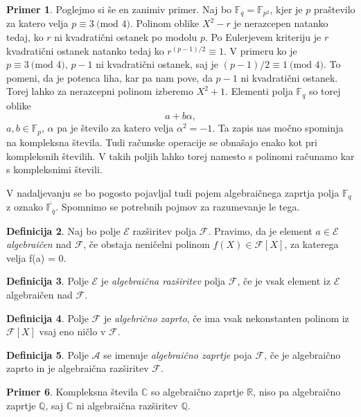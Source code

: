 \documentclass[12pt,a4paper,twoside]{article}
\theoremstyle{definition} %
\newtheorem{definicija}{Definicija}[section]
\newtheorem{primer}[definicija]{Primer}
\theoremstyle{plain} %
\numberwithin{equation}{section}  %
\newcommand{\R}{\mathbb R}
\renewcommand{\C}{\mathbb C}
\newcommand{\Q}{\mathbb Q}
\newcommand{\F}{\mathbb F}
\newcommand{\MOD}[1]{\ \text{(mod }{#1}\text{)}}
\begin{document}
\begin{primer}
Poglejmo si še en zanimiv primer. Naj bo $\F_q= \F_{p^2}$, kjer je $p$ praštevilo za katero velja $p \equiv 3 \MOD{4}$.  Polinom oblike $X^2-r$ je nerazcepen natanko tedaj, ko $r$ ni kvadratični ostanek po modolu $p$. Po  Eulerjevem kriteriju \cite{Eulerkriterij} je $r$ kvadratični ostanek natanko tedaj ko $r^{(p-1)/2} \equiv 1$. V primeru ko je $p \equiv 3 \MOD{4}$, $p-1$ ni kvadratični ostanek, saj je $(p-1)/2 \equiv 1 \MOD{4}$. To pomeni, da je potenca liha, kar pa nam pove, da $p-1$ ni kvadratični ostanek. Torej lahko za nerazcepni polinom izberemo $X^2+1$. Elementi polja $\F_q$ so torej oblike
$$a+b\alpha,$$
$a,b \in \F_p$, $\alpha$ pa je število za katero velja $\alpha^2 = -1$. Ta zapis nas močno spominja na kompleksna števila. Tudi računske operacije se obnašajo enako kot pri kompleksnih številih. V takih poljih lahko torej namesto s polinomi računamo kar s kompleksnimi števili.
\end{primer}

V nadaljevanju se bo pogosto pojavljal tudi pojem algebraičnega zaprtja polja $\F_q$ z oznako $\overline{\F_q}$. Spomnimo se potrebnih pojmov za razumevanje le tega.

\begin{definicija}
Naj bo polje $\mathcal{E}$ razširitev polja $\mathcal{F}$. Pravimo, da je element $a \in \mathcal{E}$ \emph{algebraičen}
nad $\mathcal{F}$, če obstaja neničelni polinom $f(X) \in \mathcal{F}[X]$, za katerega velja f(a) = 0.

\end{definicija}

\begin{definicija}
Polje $\mathcal{E}$ je \emph{algebraična razširitev} polja $\mathcal{F}$, če je vsak element
iz $\mathcal{E}$ algebraičen nad $\mathcal{F}$.
\end{definicija}

\begin{definicija}
Polje $\mathcal{F}$ je \emph{algebrično zaprto}, če ima vsak nekonstanten polinom
iz $\mathcal{F} [X]$ vsaj eno ničlo v $\mathcal{F}$.
\end{definicija}

\begin{definicija}
Polje $\mathcal{A}$ se imenuje \emph{algebraično zaprtje} poja $\mathcal{F}$, če je algebraično
zaprto in je algebraična razširitev $\mathcal{F}$.
\end{definicija}


\begin{primer}
Kompleksna števila $\C$ so algebraično zaprtje $\R$, niso pa algebraično zaprtje $\Q$, saj $\C$ ni algebraična razširitev $\Q$.

\end{primer}
\end{document}
